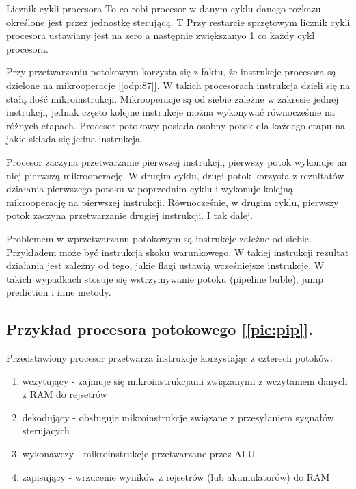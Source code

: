 \label{odp:104}
\answer
{Licznik cykli procesora}
{To co robi procesor w danym cyklu danego rozkazu określone jest przez jednostkę sterującą.}
{T}
{
Przy restarcie sprzętowym licznik cykli procesora ustawiany jest na zero a następnie zwiększanyo 1 co każdy cykl procesora.
}
{
}

{
Przy przetwarzaniu potokowym korzysta się z faktu, że instrukcje procesora są dzielone na mikrooperacje [\ref{odp:87}]. W takich procesorach instrukcja dzieli się na stałą ilość mikroinstrukcji. Mikrooperacje są od siebie zależne w zakresie jednej instrukcji, jednak często kolejne instrukcje można wykonywać równocześnie na różnych etapach. Procesor potokowy posiada osobny potok dla każdego etapu na jakie składa się jedna instrukcja.

Procesor zaczyna przetwarzanie pierwszej instrukcji, pierwszy potok wykonuje na niej pierwszą mikrooperację. W drugim cyklu, drugi potok korzysta z rezultatów działania pierwszego potoku w poprzednim cyklu i wykonuje kolejną mikrooperację na pierwszej instrukcji. Równocześnie, w drugim cyklu, pierwszy potok zaczyna przetwarzanie drugiej instrukcji. I tak dalej.

Problemem w wprzetwarzanu potokowym są instrukcje zależne od siebie. Przykładem może być instrukcja skoku warunkowego. W takiej instrukcji rezultat działania jest zależny od tego, jakie flagi ustawią wcześniejsze instrukcje. W takich wypadkach stosuje się wstrzymywanie potoku (pipeline buble), jump prediction i inne metody.

\subsection{Przykład procesora potokowego [\ref{pic:pip}].}
Przedstawiony procesor przetwarza instrukcje korzystając z czterech potoków:
\begin{enumerate}
	\item wczytujący - zajmuje się mikroinstrukcjami związanymi z wczytaniem danych z RAM do rejsetrów
	\item dekodujący - obsługuje mikroinstrukcje związane z  przesyłaniem sygnałów sterujących
	\item wykonawczy - mikroinstrukcje przetwarzane przez ALU
	\item zapisujący - wrzucenie wyników z rejsetrów (lub akumulatorów) do RAM
\end{enumerate}

}
